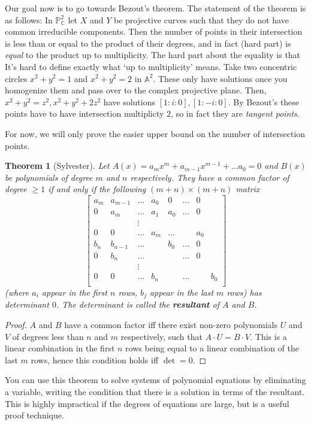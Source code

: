 \documentclass[12pt]{article}
\newcommand{\C}{\mathbb{C}}
\renewcommand{\P}{\mathbb{P}}
\newcommand{\A}{\mathbb{A}}
\newtheorem{theorem}{Theorem}[section]
\begin{document}
    Our goal now is to go towards Bezout's theorem. The statement of the theorem is as follows: In $\P_\C^2$ let $X$ and $Y$ be projective curves such that they do not have common irreducible components. Then the number of points in their intersection is less than or equal to the product of their degrees, and in fact (hard part) is \textit{equal} to the product up to multiplicity. The hard part about the equality is that It's hard to define exactly what `up to multiplicity' means. Take two concentric circles $x^2 + y^2 = 1$ and $x^2 + y^2 = 2$ in $\A^2$. These only have solutions once you homogenize them and pass over to the complex projective plane. Then, $x^2 + y^2 = z^2, x^2 + y^2 + 2z^2$ have solutions $[1:i:0], [1:-i:0]$. By Bezout's these points have to have intersection multiplicty $2$, so in fact they are \textit{tangent points}. \par
    For now, we will only prove the easier upper bound on the number of intersection points.
    \begin{theorem}[Sylvester]
        Let $A(x) = a_mx^m + a_{m-1}x^{m-1} + \dots a_0 = 0$ and $B(x)$ be polynomials of degree $m$ and $n$ respectively. They have a common factor of degree $\geq 1$ if and only if the following $(m+n) \times (m+n)$ matrix
        $$\begin{bmatrix}
            a_m & a_{m-1} & \dots & a_0 & 0 & \dots & 0 \\
            0 & a_m & \dots & a_1 & a_0 & \dots & 0 \\
            & & \vdots & & \\
            0 & 0 & \dots & a_m & \dots & & a_0 \\
            b_n & b_{n-1} & \dots & &  b_0 & \dots & 0 \\
            0 & b_n & \dots & & & \dots & 0 \\
            & & \vdots & & \\
            0 & 0 & \dots & b_n & & \dots & & b_0 \\
        \end{bmatrix}$$
        (where $a_i$ appear in the first $n$ rows, $b_j$ appear in the last $m$ rows) has determinant $0$. The determinant is called the \textbf{resultant} of $A$ and $B$.
    \end{theorem}
    \begin{proof}
        $A$ and $B$ have a common factor iff there exist non-zero polynomials $U$ and $V$ of degrees less than $n$ and $m$ respectively, such that $A\cdot U = B \cdot V$. This is a linear combination in the first $n$ rows being equal to a linear combination of the last $m$ rows, hence this condition holds iff $\det = 0$.
    \end{proof}
    You can use this theorem to solve systems of polynomial equations by eliminating a variable, writing the condition that there is a solution in terms of the resultant. This is highly impractical if the degrees of equations are large, but is a useful proof technique.
\end{document}
